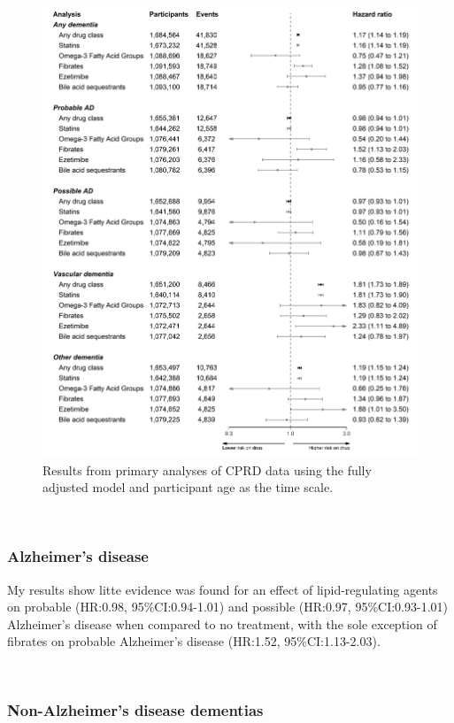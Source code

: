 \documentclass[a4paper, twoside]{templates/ociamthesis}
\begin{document}
\begin{figure}[H]
\includegraphics[width=1\linewidth]{figures/cprd-analysis/forester_p1} \caption[Results from primary analyses of CPRD data]{Results from primary analyses of CPRD data using the fully adjusted model and participant age as the time scale.}\label{fig:cprdPrimary}
\end{figure}

~

\hypertarget{alzheimers-disease}{%
\subsubsection{Alzheimer's disease}\label{alzheimers-disease}}

My results show litte evidence was found for an effect of lipid-regulating agents on probable (HR:0.98, 95\%CI:0.94-1.01) and possible (HR:0.97, 95\%CI:0.93-1.01) Alzheimer's disease when compared to no treatment, with the sole exception of fibrates on probable Alzheimer's disease (HR:1.52, 95\%CI:1.13-2.03).

~

\hypertarget{non-alzheimers-disease-dementias}{%
\subsubsection{Non-Alzheimer's disease dementias}\label{non-alzheimers-disease-dementias}}
\end{document}
